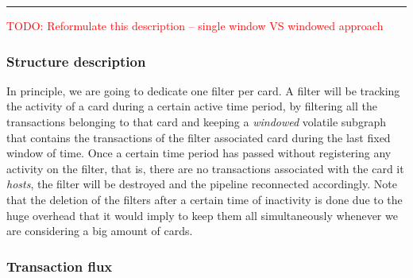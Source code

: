 

\textcolor{red}{\rule{\linewidth}{0.5mm}}
\textcolor{red}{TODO: Reformulate this description -- single window VS windowed approach}
\begin{graysection}
\subsubsection{Structure description}


In principle, we are going to dedicate one filter per card. A filter will be tracking the activity of a card during a certain active time period, by filtering all the transactions belonging to that card and keeping a \textit{windowed} volatile subgraph that contains the transactions of the filter associated card during the last fixed window of time. Once a certain time period has passed without registering any activity on the filter, that is, there are no transactions associated with the card it \textit{hosts}, the filter will be destroyed and the pipeline reconnected accordingly. 
Note that the deletion of the filters after a certain time of inactivity is done due to the huge overhead that it would imply to keep them all simultaneously whenever we are considering a big amount of cards.

\subsubsection{Transaction flux}


\end{graysection}

